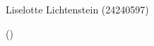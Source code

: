 \begin{titlepage}
    \centering
    \vspace*{0.2cm}
    
    {\Huge \mytitle \par}
    \vspace{1.4cm}
    
    {\Large \myassignment \par}    
    {\Large \mycourse \par}
    
    \vspace{1.4cm}
    
    {\large Liselotte Lichtenstein (24240597) \par}
    {\large \myname (\myid) \par}



    \vspace{0.9cm}



    \vfill
    
    {\Large \mydate \par}
\end{titlepage}